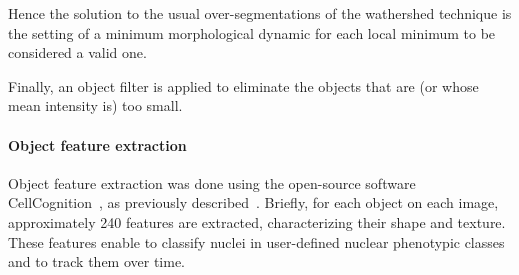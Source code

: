 Hence the solution to the usual over-segmentations of the wathershed technique is the setting of a minimum morphological dynamic for each local minimum to be considered a valid one. 
%

Finally, an object filter is applied to eliminate the objects that are (or whose mean intensity is) too small.

\paragraph{Object feature extraction}
Object feature extraction was done using the open-source software CellCognition~\cite{cellcognition}, as previously described~\cite{Walter2010}. Briefly, for each object on each image, approximately 240 features are extracted, characterizing their shape and texture. These features enable to classify nuclei in user-defined nuclear phenotypic classes and to track them over time.

